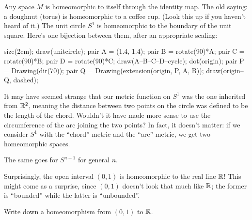 \begin{example}
	\listhack
	\begin{enumerate}[(a)]
		\ii Any space $M$ is homeomorphic to itself through the identity map.
		\ii The old saying: a doughnut (torus) is homeomorphic to a coffee cup.
		(Look this up if you haven't heard of it.)
		\ii The unit circle $S^1$ is homeomorphic to the boundary of the unit square.
		Here's one bijection between them, after an appropriate scaling:
		\begin{center}
			\begin{asy}
				size(2cm);
				draw(unitcircle);
				pair A = (1.4, 1.4);
				pair B = rotate(90)*A;
				pair C = rotate(90)*B;
				pair D = rotate(90)*C;
				draw(A--B--C--D--cycle);
				dot(origin);
				pair P = Drawing(dir(70));
				pair Q = Drawing(extension(origin, P, A, B));
				draw(origin--Q, dashed);
			\end{asy}
		\end{center}
	\end{enumerate}
\end{example}
\begin{example}
	It may have seemed strange that our metric function on $S^1$
	was the one inherited from $\mathbb R^2$, meaning the distance between two points
	on the circle was defined to be the length of the chord.
	Wouldn't it have made more sense to use the circumference of the arc joining
	the two points?
	In fact, it doesn't matter: if we consider $S^1$ with the ``chord'' metric
	and the ``arc'' metric, we get two homeomorphic spaces.

	The same goes for $S^{n-1}$ for general $n$.
\end{example}

\begin{example}
	Surprisingly, the open interval $(0,1)$ is homeomorphic to the real line $\mathbb R$!
	This might come as a surprise, since $(0,1)$ doesn't look that much like $\mathbb R$;
	the former is ``bounded'' while the latter is ``unbounded''.
\end{example}
\begin{exercise}
	Write down a homeomorphism from $(0,1)$ to $\mathbb R$.
\end{exercise}

